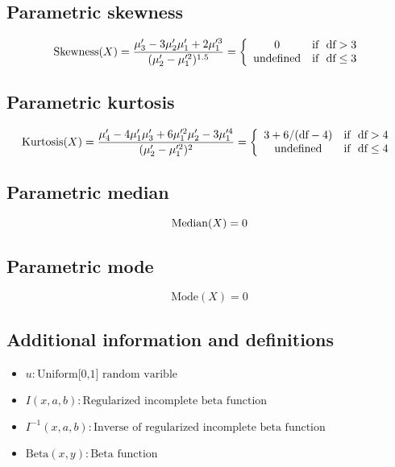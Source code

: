 \documentclass{article}
\begin{document}
\subsection{Parametric skewness}
\begin{equation*} \mathrm{Skewness}(X)=\frac{\mu'_{3}-3\mu'_{2}\mu'_{1}+2\mu'^{3}_{1}}{(\mu'_{2}-\mu'^{2}_{1})^{1.5}}=\left\{\begin{array}{cl} 0 & \text{if } \ \text{df} > 3 \\ \text{undefined} & \text{if } \  \text{df} \leq 3 \end{array} \right.\\ \end{equation*}
\subsection{Parametric kurtosis}
\begin{equation*} \mathrm{Kurtosis}(X)=\frac{\mu'_{4}-4\mu'_{1}\mu'_{3}+6\mu'^{2}_{1}\mu'_{2}-3\mu'^{4}_{1}}{(\mu'_{2}-\mu'^{2}_{1})^{2}}=\left\{\begin{array}{cl} 3+6/(\text{df}-4) & \text{if } \ \text{df} > 4 \\ \text{undefined} & \text{if } \ \text{df} \leq 4 \end{array} \right.\\ \end{equation*}
\subsection{Parametric median}
\begin{equation*} \mathrm{Median}(X)=0\\ \end{equation*}
\subsection{Parametric mode}
\begin{equation*} \mathrm{Mode}(X)=0 \end{equation*}
\subsection{Additional information and definitions}
\begin{itemize}
    \item $ u:\text{Uniform[0,1] random varible} $
    \item $ I\left(x,a,b\right):\text{Regularized incomplete beta function} $
    \item $ I^{-1}\left(x,a,b\right):\text{Inverse of regularized incomplete beta function} $
    \item $ \text{Beta}\left(x,y\right):\text{Beta function} $
\end{itemize}
\end{document}
